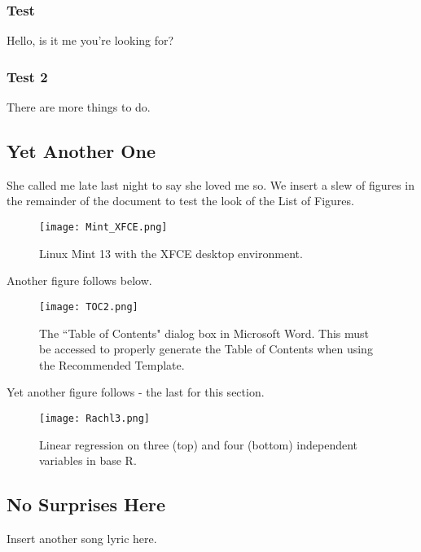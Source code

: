 \subsubsection{Test}
Hello, is it me you're looking for?

\subsubsection{Test 2}
There are more things to do.

\subsection{Yet Another One}
She called me late last night to say she loved me so. We insert a slew of figures in the remainder of the document to test the look of the List of Figures.

\begin{figure}[H]
	\centering
	\texttt{[image: Mint\_XFCE.png]}
	\caption{Linux Mint 13 with the XFCE desktop environment.}
\end{figure}

Another figure follows below.

\begin{figure}[H]
	\centering
	\texttt{[image: TOC2.png]}
	\singlespace
	\caption{The ``Table of Contents" dialog box in Microsoft Word. This must be accessed to properly generate the Table of Contents when using the Recommended Template.}
\end{figure}

Yet another figure follows - the last for this section.

\begin{figure}[H]
	\centering
	\texttt{[image: Rachl3.png]}
	\singlespace
	\caption{Linear regression on three (top) and four (bottom) independent variables in base R.}
\end{figure}
 
 \subsection{No Surprises Here}
 Insert another song lyric here.

